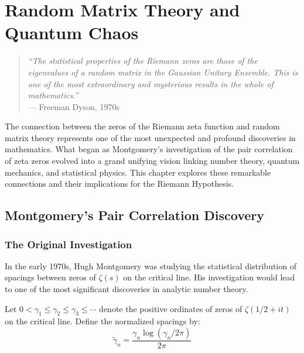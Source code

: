 
\chapter{Random Matrix Theory and Quantum Chaos}
\label{ch:random_matrix}

\begin{quote}
\textit{``The statistical properties of the Riemann zeros are those of the eigenvalues of a random matrix in the Gaussian Unitary Ensemble. This is one of the most extraordinary and mysterious results in the whole of mathematics.''} \\
--- Freeman Dyson, 1970s
\end{quote}

The connection between the zeros of the Riemann zeta function and random matrix theory represents one of the most unexpected and profound discoveries in mathematics. What began as Montgomery's investigation of the pair correlation of zeta zeros evolved into a grand unifying vision linking number theory, quantum mechanics, and statistical physics. This chapter explores these remarkable connections and their implications for the Riemann Hypothesis.

\section{Montgomery's Pair Correlation Discovery}
\label{sec:montgomery_pair_correlation}

\subsection{The Original Investigation}

In the early 1970s, Hugh Montgomery was studying the statistical distribution of spacings between zeros of $\zeta(s)$ on the critical line. His investigation would lead to one of the most significant discoveries in analytic number theory.

\begin{definition}
\label{def:normalized_spacings}
Let $0 < \gamma_1 \leq \gamma_2 \leq \gamma_3 \leq \cdots$ denote the positive ordinates of zeros of $\zeta(1/2 + it)$ on the critical line. Define the normalized spacings by:
\begin{equation}
\tilde{\gamma}_n = \frac{\gamma_n \log(\gamma_n/2\pi)}{2\pi}
\label{eq:normalized_spacings}
\end{equation}
\end{definition}

